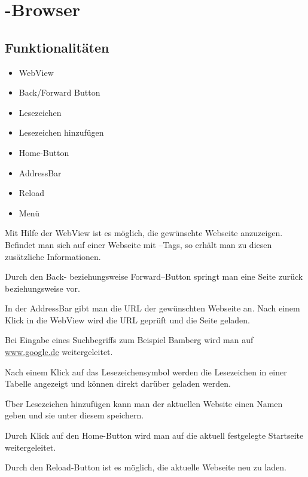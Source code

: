 \chapter{\SECH-Browser}

\section{Funktionalitäten}

\begin{itemize}
	\item WebView
	\item Back/Forward Button
	\item Lesezeichen
	\item Lesezeichen hinzufügen
	\item Home-Button
	\item AddressBar
	\item Reload
	\item Menü
\end{itemize}

Mit Hilfe der WebView ist es möglich, die gewünschte Webseite
anzuzeigen. Befindet man sich auf einer Webseite mit \SEACH--Tags, so
erhält man zu diesen zusätzliche Informationen.

Durch den Back- beziehungsweise Forward--Button springt man eine Seite
zurück beziehungsweise vor.

In der AddressBar gibt man die URL der gewünschten Webseite an. Nach
einem Klick in die WebView wird die URL geprüft und die Seite geladen.

Bei Eingabe eines Suchbegriffs zum Beispiel Bamberg wird man auf
\url{www.google.de} weitergeleitet.

Nach einem Klick auf das Lesezeichensymbol werden die Lesezeichen in einer
Tabelle angezeigt und können direkt darüber geladen werden.

Über Lesezeichen hinzufügen kann man der aktuellen Website einen Namen geben
und sie unter diesem speichern.

Durch Klick auf den Home-Button wird man auf die aktuell festgelegte
Startseite weitergeleitet.

Durch den Reload-Button ist es möglich, die aktuelle Webseite neu zu laden.